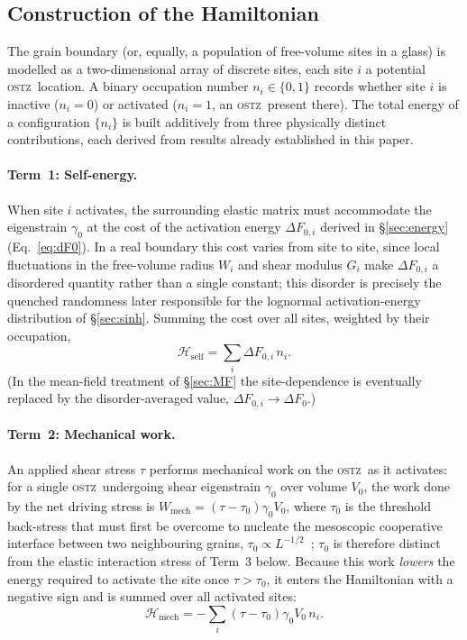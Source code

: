 \documentclass[5p,sort&compress]{elsarticle}
\newcommand{\OSTZ}{\textsc{ostz}}
\newcommand{\dF}{\Delta F_0}
\newcommand{\gz}{\gamma_0}
\begin{document}
\subsection{Construction of the Hamiltonian}
\label{sec:Hamiltonian}

The grain boundary (or, equally, a population of free-volume sites
in a glass) is modelled as a two-dimensional array of discrete
sites, each site $i$ a potential \OSTZ\ location. A binary occupation
number $n_i\in\{0,1\}$ records whether site $i$ is inactive ($n_i=0$)
or activated ($n_i=1$, an \OSTZ\ present there). The total energy of
a configuration $\{n_i\}$ is built additively from three physically
distinct contributions, each derived from results already established
in this paper.

\paragraph{Term~1: Self-energy.}
When site $i$ activates, the surrounding elastic matrix must
accommodate the eigenstrain $\gz$ at the cost of the activation
energy $\Delta F_{0,i}$ derived in \S\ref{sec:energy}
(Eq.~\eqref{eq:dF0}). In a real boundary this cost varies from site
to site, since local fluctuations in the free-volume radius $W_i$ and
shear modulus $G_i$ make $\Delta F_{0,i}$ a disordered quantity rather
than a single constant; this disorder is precisely the quenched
randomness later responsible for the lognormal activation-energy
distribution of \S\ref{sec:sinh}. Summing the cost over all sites,
weighted by their occupation,
\begin{equation}
  \mathcal H_\text{self}=\sum_i\Delta F_{0,i}\,n_i.
  \label{eq:Hself}
\end{equation}
(In the mean-field treatment of \S\ref{sec:MF} the site-dependence is
eventually replaced by the disorder-averaged value, $\Delta
F_{0,i}\to\dF$.)

\paragraph{Term~2: Mechanical work.}
An applied shear stress $\tau$ performs mechanical work on the
\OSTZ\ as it activates: for a single \OSTZ\ undergoing shear
eigenstrain $\gz$ over volume $V_0$, the work done by the net driving
stress is $W_\mathrm{mech}=(\tau-\tau_0)\gz V_0$, where $\tau_0$ is
the threshold back-stress that must first be overcome to nucleate
the mesoscopic cooperative interface between two neighbouring grains,
$\tau_0\propto L^{-1/2}$~\cite{pad-part1}; $\tau_0$ is therefore
distinct from the elastic interaction stress of Term~3 below. Because
this work \emph{lowers} the energy required to activate the site once
$\tau>\tau_0$, it enters the Hamiltonian with a negative sign and is
summed over all activated sites:
\begin{equation}
  \mathcal H_\text{mech}=-\sum_i(\tau-\tau_0)\gz V_0\,n_i.
  \label{eq:Hmech}
\end{equation}
\end{document}
